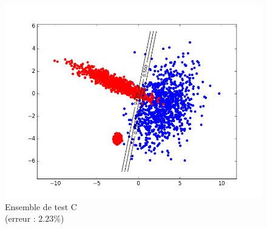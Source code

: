 \documentclass[paper=a4, fontsize=11pt]{article}
\begin{document}
\begin{figure}[h]
 \begin{minipage}[b]{.3\linewidth}
  \begin{center}
  \includegraphics[scale=0.25]{figures/LDA_C_test.png}
  \caption*{Ensemble de test C  \\ (erreur : $2.23\%$)}
   \end{center}
 \end{minipage}
\end{figure}
\newpage
\end{document}
